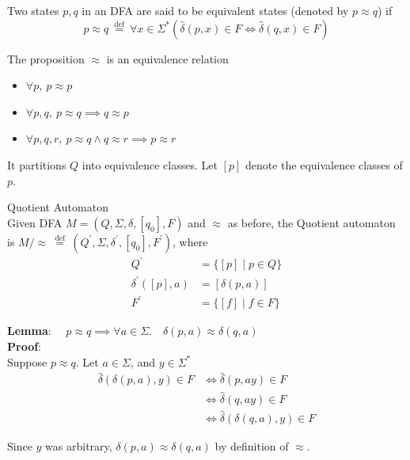 \documentclass{report}
\newcommand{\dhat}{\hat{\delta}}
\begin{document}
Two states $p,q$ in an DFA are said to be equivalent states (denoted by $p\approx q$) if
$$ p\approx q \ \overset{\text{def}}{=} \ \forall x \in \Sigma^* (\hat{\delta}(p,x) \in F \iff \hat{\delta}(q,x) \in F)$$

The proposition $\approx$ is an equivalence relation
\begin{itemize}
  \item $\forall p, \ p \approx p$
  \item $\forall p,q, \ p \approx q \implies q \approx p $
  \item $\forall p,q,r, \ p \approx q \land q \approx r \implies p \approx r$
\end{itemize}

It partitions $Q$ into equivalence classes. Let $[p]$ denote the equivalence classes of $p$. \\

\newpage

{\Large Quotient Automaton} \\


Given DFA $M=\left(Q, \Sigma, \delta,\left[q_0\right], F\right)$ and $\approx$ as before, the Quotient automaton is $M / \approx \stackrel{\text { def }}{=}\left(Q^{\prime}, \Sigma, \delta^{\prime},\left[q_0\right], F^{\prime}\right)$, where
$$
  \begin{aligned}
    Q^{\prime}              & = \{[p] \mid p \in Q\} \\
    \delta^{\prime}([p], a) & = [\delta(p, a)]       \\
    F^{\prime}              & = \{[f] \mid f \in F\}
  \end{aligned}
$$

\textbf{Lemma}: $\quad p \approx q \implies \forall a \in \Sigma . \quad \delta(p, a) \approx \delta(q, a)$ \\
\textbf{Proof}: \\
Suppose $p \approx q$. Let $a \in \Sigma$, and $y \in \Sigma^*$
\begin{align*}
  \dhat(\delta(p,a),y) \in F & \iff \dhat(p,ay) \in F          \\
                             & \iff \dhat(q,ay) \in F          \\
                             & \iff \dhat(\delta(q,a),y) \in F
\end{align*}

Since $y$ was arbitrary, $\delta(p,a) \approx \delta(q,a)$ by definition of $\approx$. \\
\end{document}
